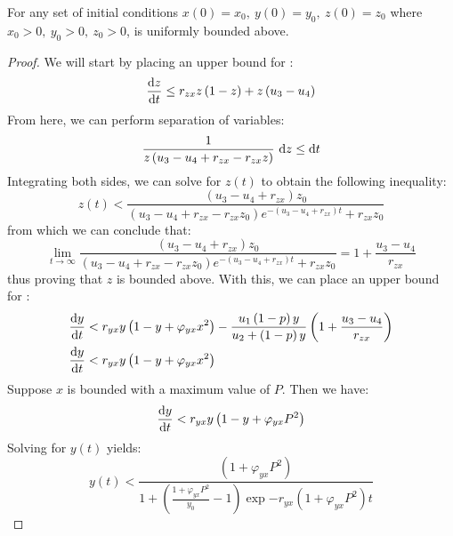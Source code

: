 \begin{theorem}\label{thm:bounded}
    For any set of initial conditions $x(0) = x_0,\ y(0) = y_0,\ z(0) = z_0$ where $x_0 > 0,\ y_0 > 0,\ z_0 > 0$,  is uniformly bounded above.
\end{theorem}
\begin{proof}
    We will start by placing an upper bound for :
    \begin{equation*}
        \diff[]{z}{t} \leq r_{zx}z\left(1-z\right)+z\left(u_3-u_4\right)
    \end{equation*}
    From here, we can perform separation of variables:
    \begin{equation*}
        \frac{1}{z\left(u_3-u_4+r_{zx}-r_{zx}z\right)}\ \opdiff{z} \leq \opdiff{t}
    \end{equation*}
    Integrating both sides, we can solve for $z(t)$ to obtain the following inequality:
    \begin{equation*}
        z(t) < \frac{\left(u_3-u_4+r_{zx}\right)z_0}{\left(u_3-u_4+r_{zx}-r_{zx}z_0\right)e^{-\left(u_3-u_4+r_{zx}\right)t}+r_{zx}z_0}
    \end{equation*}
    from which we can conclude that:
    \begin{equation*}
        \lim_{t\to\infty} \frac{\left(u_3-u_4+r_{zx}\right)z_0}{\left(u_3-u_4+r_{zx}-r_{zx}z_0\right)e^{-\left(u_3-u_4+r_{zx}\right)t}+r_{zx}z_0} = 1+\frac{u_3-u_4}{r_{zx}}
    \end{equation*}
    thus proving that $z$ is bounded above.
    With this, we can place an upper bound for :
    \begin{align*}
        \diff[]{y}{t} &< r_{yx}y\left(1-y+\varphi_{yx}x^2\right)-\frac{u_1\left(1-p\right)y}{u_2+\left(1-p\right)y}\left(1+\frac{u_3-u_4}{r_{zx}}\right)\\
        \diff[]{y}{t} &< r_{yx}y\left(1-y+\varphi_{yx}x^2\right)
    \end{align*}
    Suppose $x$ is bounded with a maximum value of $P$.
    Then we have:
    \begin{equation*}
        \diff[]{y}{t} < r_{yx}y\left(1-y+\varphi_{yx}P^2\right)
    \end{equation*}
    Solving for $y(t)$ yields:
    \begin{equation*}
        y(t) < \frac{\left(1+\varphi_{yx}P^2\right)}{1+\left(\frac{1+\varphi_{yx}P^2}{y_0}-1\right)\exp{-r_{yx}\left(1+\varphi_{yx}P^2\right)t}}
    \end{equation*}

\end{proof}
